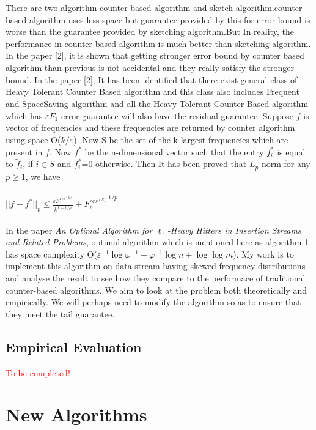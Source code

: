 \documentclass{article}
\begin{document}
\begin{multicols}{2}
{There are two algorithm counter based algorithm and sketch algorithm.counter based algorithm uses less space but guarantee provided by this for error bound is worse than the guarantee provided by sketching algorithm.But In reality, the performance in counter based algorithm is much better than sketching algorithm. In the paper [2], it is shown that getting stronger error bound by counter based algorithm than previous is not accidental and they really satisfy the stronger bound. In the paper [2], It has been identified that there exist general class of Heavy Tolerant Counter Based algorithm and this class also includes Frequent and SpaceSaving algorithm and all the Heavy Tolerant Counter Based algorithm which has $\varepsilon F_{1}$ error guarantee will also have the residual guarantee. Suppose $\tilde{f}$ is vector of frequencies and these frequencies are returned by counter algorithm using space O($k/\varepsilon$). Now S be the set of the k largest frequencies which are present in $\tilde{f}$. Now $f^{*}$ be the n-dimensional vector such that the entry $f^{*}_{i}$ is equal to $\tilde{f}_{i}$, if $i\in S$ and  $f^{*}_{i}$=0 otherwise. Then It has been proved that $L_{p}$ norm for any $p\geqslant 1$, we have
 \\
\\\hspace*{1cm} $||f-f^{*}||_{p}\leqslant \frac {\varepsilon F_{1}^{res^{(k)}}}{k^{1-1/p}} +{F_{p}^{res^{(k)}}}^{1/p} $
\\
\\


In the paper {\em An Optimal Algorithm for $\ell_1$-Heavy Hitters in Insertion Streams and Related Problems}, optimal algorithm which is mentioned here as algorithm-1, has space complexity O($\varepsilon^{-1} \log \varphi^{-1} + \varphi^{-1} \log n + \log \log m$). My work is to implement this algorithm on data stream having skewed frequency distributions and analyse the result to see how they compare to the performace of traditional counter-based algorithms. We aim to look at the problem both theoretically and empirically. We will perhaps need to modify the algorithm so as to ensure that they meet the tail guarantee.
}


\subsection{Empirical Evaluation}

\textcolor{red}{To be completed!}

\section{New Algorithms}


\end{multicols}
\end{document}
